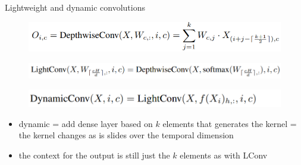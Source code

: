 \documentclass{beamer}
\begin{document}
\begin{frame}{Lightweight and dynamic convolutions}

\begin{figure}[h]
\includegraphics[width=1.0\textwidth]{img/depthwise_math}
\end{figure}

\begin{figure}[h]
\includegraphics[width=1.0\textwidth]{img/light_math}
\end{figure}

\begin{figure}[h]
\includegraphics[width=1.0\textwidth]{img/dynamic_conv_math}
\end{figure}

\begin{itemize}
\item dynamic = add dense layer based on $k$ elements  that generates the kernel = the kernel changes as is slides over the temporal dimension
\item the context for the output is still just the $k$ elements as with LConv
\end{itemize}

\end{frame}
\end{document}
